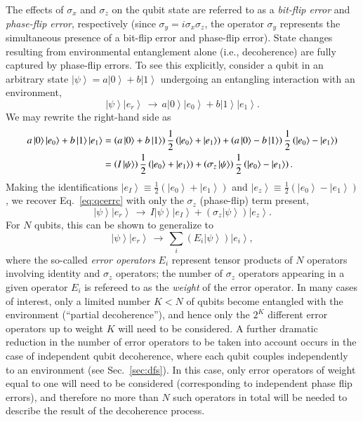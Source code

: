 \documentclass[3p,sort&compress]{elsarticle}
\newcommand{\ket}[1]{\left\vert{#1}\right\rangle}
\newcommand{\I}{\ensuremath{i}}
\newcommand{\op}[1]{#1}
\begin{document}
The effects of $\sigma_x$ and $\sigma_z$ on the qubit state are referred to as a \emph{bit-flip error} and \emph{phase-flip error}, respectively (since $\op{\sigma}_y= \I\op{\sigma}_x\op{\sigma}_z$, the operator $\op{\sigma}_y$ represents the simultaneous presence of a bit-flip error and phase-flip error). State changes resulting from environmental entanglement alone (i.e., decoherence) are fully captured by phase-flip errors. To see this explicitly, consider a qubit in an arbitrary state $\ket{\psi}=a\ket{0}+b\ket{1}$ undergoing an entangling interaction with an environment,
%
\begin{equation} 
\ket{\psi}\ket{e_r} \,\longrightarrow\, a\ket{0}\ket{e_0}+b\ket{1}\ket{e_1}.
\end{equation}
%
We may rewrite the right-hand side as
%
\begin{align} 
a\ket{0}\ket{e_0}+b\ket{1}\ket{e_1} &= \left( a\ket{0}+b\ket{1} \right) \frac{1}{2} \left( \ket{e_0}+\ket{e_1}\right) + \left( a\ket{0}-b\ket{1} \right) \frac{1}{2} \left( \ket{e_0}-\ket{e_1}\right) \notag \\
&= \left(\op{I} \ket{\psi} \right) \frac{1}{2} \left( \ket{e_0}+\ket{e_1}\right) + \left(\op{\sigma}_z \ket{\psi} \right) \frac{1}{2} \left( \ket{e_0}-\ket{e_1}\right).
\end{align}
%
Making the identifications $\ket{e_I} \equiv \frac{1}{2} \left( \ket{e_0}+\ket{e_1}\right)$ and $\ket{e_z} \equiv \frac{1}{2} \left( \ket{e_0}-\ket{e_1}\right)$, we recover Eq.~\eqref{eq:qcerrc} with only the $\op{\sigma}_z$ (phase-flip) term present,
%
\begin{equation} \label{eq:qcerrcaa} \ket{\psi}
  \ket{e_r}  \, \longrightarrow \, I
  \ket{\psi} \ket{e_I} + 
  \left( \sigma_z \ket{\psi} \right)
  \ket{e_z}.
\end{equation}
%
For $N$ qubits, this can be shown to generalize to 
%
\begin{equation}\label{eq:qcerrcN}
  \ket{\psi} \ket{e_r} \, \longrightarrow\,
  \sum_{i} 
  \left( E_i \ket{\psi} \right) \ket{e_i},
\end{equation}
%
where the so-called \emph{error operators} $E_i$ represent tensor products of $N$ operators involving identity and $\sigma_z$ operators; the number of $\sigma_z$ operators appearing in a given operator $E_i$ is refereed to as the \emph{weight} of the error operator. In many cases of interest, only a limited number $K<N$ of qubits become entangled with the environment  (``partial decoherence''), and hence only the $2^K$ different error operators up to weight $K$ will need to be considered. A further dramatic reduction in the number of error operators to be taken into account occurs in the case of independent qubit decoherence, where each qubit couples independently to an environment (see Sec.~\ref{sec:dfs}). In this case, only error operators of weight equal to one will need to be considered (corresponding to independent phase flip errors), and therefore no more than $N$ such operators in total will be needed to describe the result of the decoherence process. 
\end{document}
